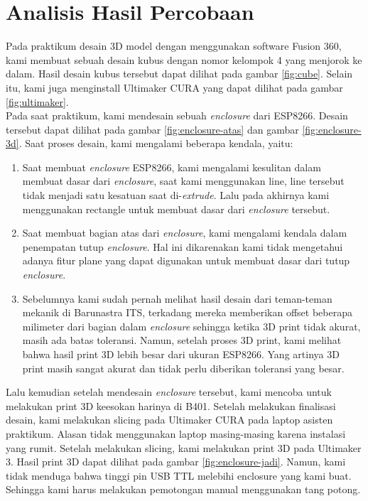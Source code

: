 \section*{Analisis Hasil Percobaan}
\indent
Pada praktikum desain 3D model dengan menggunakan software Fusion 360, kami membuat sebuah desain kubus dengan nomor kelompok 4 yang menjorok ke dalam. Hasil desain kubus tersebut dapat dilihat pada gambar \ref{fig:cube}. Selain itu, kami juga menginstall Ultimaker CURA yang dapat dilihat pada gambar \ref{fig:ultimaker}. \\

\indent
Pada saat praktikum, kami mendesain sebuah \textit{enclosure} dari ESP8266. Desain tersebut dapat dilihat pada gambar \ref{fig:enclosure-atas} dan gambar \ref{fig:enclosure-3d}. Saat proses desain, kami mengalami beberapa kendala, yaitu:
\begin{enumerate}
  \item Saat membuat \textit{enclosure} ESP8266, kami mengalami kesulitan dalam membuat dasar dari \textit{enclosure}, saat kami menggunakan line, line tersebut tidak menjadi satu kesatuan saat di-\textit{extrude}. Lalu pada akhirnya kami menggunakan rectangle untuk membuat dasar dari \textit{enclosure} tersebut.
  \item Saat membuat bagian atas dari \textit{enclosure}, kami mengalami kendala dalam penempatan tutup \textit{enclosure}. Hal ini dikarenakan kami tidak mengetahui adanya fitur plane yang dapat digunakan untuk membuat dasar dari tutup \textit{enclosure}.
  \item Sebelumnya kami sudah pernah melihat hasil desain dari teman-teman mekanik di Barunastra ITS, terkadang mereka memberikan offset beberapa milimeter dari bagian dalam \textit{enclosure} sehingga ketika 3D print tidak akurat, masih ada batas toleransi. Namun, setelah proses 3D print, kami melihat bahwa hasil print 3D lebih besar dari ukuran ESP8266. Yang artinya 3D print masih sangat akurat dan tidak perlu diberikan toleransi yang besar.
\end{enumerate}

\indent
Lalu kemudian setelah mendesain \textit{enclosure} tersebut, kami mencoba untuk melakukan print 3D keesokan harinya di B401. Setelah melakukan finalisasi desain, kami melakukan slicing pada Ultimaker CURA pada laptop asisten praktikum. Alasan tidak menggunakan laptop masing-masing karena instalasi yang rumit. Setelah melakukan slicing, kami melakukan print 3D pada Ultimaker 3. Hasil print 3D dapat dilihat pada gambar \ref{fig:enclosure-jadi}. Namun, kami tidak menduga bahwa tinggi pin USB TTL melebihi enclosure yang kami buat. Sehingga kami harus melakukan pemotongan manual menggunakan tang potong.

